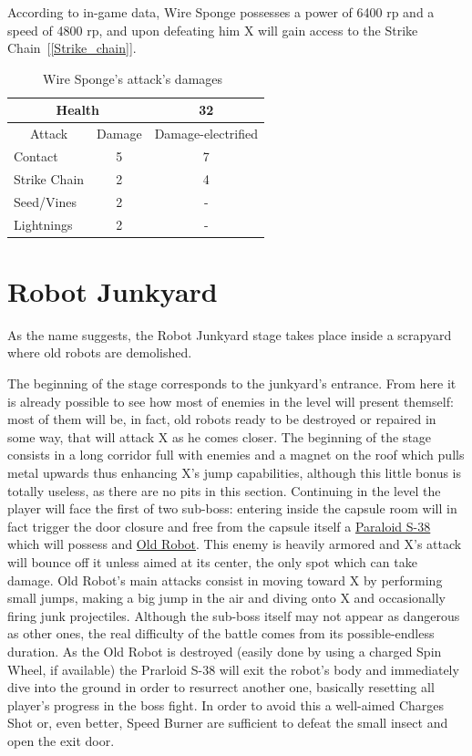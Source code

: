 According to in-game data, Wire Sponge possesses a power of 6400 rp and a speed of 4800 rp, and upon defeating him X will gain access to the Strike Chain~[\ref{Strike_chain}].
\begin{table}[htp]
	\centering
	\begin{tabular}[h]{l c c}
		
		\toprule
		\multicolumn{2}{c}{Health}  & 32\\
		\midrule
		\multicolumn{1}{c}{Attack} & \multicolumn{1}{c}{Damage}& \multicolumn{1}{c}{Damage-electrified}\\
		Contact & 5 & 7\\
		Strike Chain & 2 & 4\\
		Seed/Vines& 2&-\\
		Lightnings & 2&-\\
		\bottomrule
	\end{tabular}
	\caption{Wire Sponge's attack's damages~\cite{wiki:wire_sponge}}
\end{table}

\section{Robot Junkyard}
As the name suggests, the Robot Junkyard stage takes place inside a scrapyard where old robots are demolished.

The beginning of the stage corresponds to the junkyard's entrance. From here it is already possible to see how most of enemies in the level will present themself: most of them will be, in fact, old robots ready to be destroyed or repaired in some way, that will attack X as he comes closer. The beginning of the stage consists in a long corridor full with enemies and a magnet on the roof which pulls metal upwards thus enhancing X's jump capabilities, although this little bonus is totally useless, as there are no pits in this section. Continuing in the level the player will face the first of two sub-boss: entering inside the capsule room will in fact trigger the door closure and free from the capsule itself a \hyperlink{miniboss:Paraloid_S-38}{Paraloid S-38} which will possess and \hyperlink{miniboss:Old_robot}{Old Robot}. This enemy is heavily armored and X's attack will bounce off it unless aimed at its center, the only spot which can take damage. Old Robot's main attacks consist in moving toward X by performing small jumps, making a big jump in the air and diving onto X and occasionally firing junk projectiles. Although the sub-boss itself may not appear as dangerous as other ones, the real difficulty of the battle comes from its possible-endless duration. As the Old Robot is destroyed (easily done by using a charged Spin Wheel, if available) the Prarloid S-38 will exit the robot's body and immediately dive into the ground in order to resurrect another one, basically resetting all player's progress in the boss fight. In order to avoid this a well-aimed Charges Shot or, even better, Speed Burner are sufficient to defeat the small insect and open the exit door.

